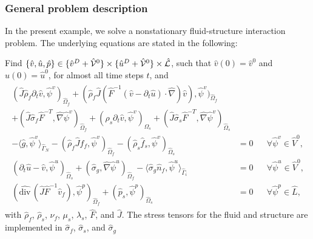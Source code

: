 \subsubsection{General problem description}

In the present example, we solve a 
nonstationary fluid-structure interaction problem. 
The underlying equations are stated in the following:
\begin{Problem}
  \label{eq:fsi:ale:harmonic}
  Find $\{\hat v,\hat u,\hat p\} \in \{ \hat v^D + \hat {\cal V}^0\} 
\times \{ \hat u^D + \hat {\cal V}^0 \}\times \hat {\cal L}$, 
  such that $\hat v (0) = \hat v^0$ and $\hat u(0) = \hat u^0$, for almost all
  time steps $t$, and
  \begin{eqnarray*}
    \begin{aligned}
      (\hat J\hat\rho_f  \partial_t \hat v,\hat\psi^v)_{\hat\Omega_f}  
      +(\hat\rho_f \hat J  (\hat F^{-1}(\hat
      v-\partial_t \hat u)\cdot\hat\nabla) \hat v),
      \hat\psi^v)_{\hat\Omega_f} &\\
      + (\hat J\hat\sigma_f\hat
      F^{-T},\hat\nabla\hat\psi^v)_{\hat\Omega_f}
      + (\hat\rho_s \partial_t \hat v,\hat\psi^v)_{\Omega_s}  
      + (\hat J\hat\sigma_s\hat F^{-T},\hat\nabla\hat\psi^v)_{\hat\Omega_s}&\\
      - \langle \hat g, \hat\psi^v \rangle_{\hat\Gamma_N} -
      (\hat\rho_f \hat J\hat f_f, \hat\psi^v)_{\hat\Omega_f}
      - (\hat\rho_s\hat f_s, \hat\psi^v)_{\hat\Omega_s}
      &=0&&\forall\hat\psi^v\in \hat V^0,
      \\
      (\partial_t\hat u-\hat v,\hat\psi^u)_{\hat\Omega_s} 
      + 
      (\hat\sigma_g ,\hat \nabla\hat\psi^u)_{\hat\Omega_f}
      -\langle \hat\sigma_g \hat n_f ,\hat\psi^u\rangle_{\hat \Gamma_i}
      &=0&&\forall\hat\psi^u\in \hat V^0,\\
      (\widehat{\text{div}}\,(\hat J\hat F^{-1}
      \hat v_f),\hat\psi^p)_{\hat\Omega_f} 
      + (\hat p_s ,\hat \psi^p)_{\hat\Omega_s}
      &=0&&\forall\hat\psi^p\in \hat L,
    \end{aligned}
  \end{eqnarray*}  
  with $\hat\rho_f$, $\hat\rho_s$, $\nu_f$, $\mu_s$, $\lambda_s$, $\hat F$, and $\hat J$. 
  The stress tensors for the fluid and structure are
implemented in  
  $\hat\sigma_f$, $\hat\sigma_s$, and $\hat\sigma_g$ 
\end{Problem}







